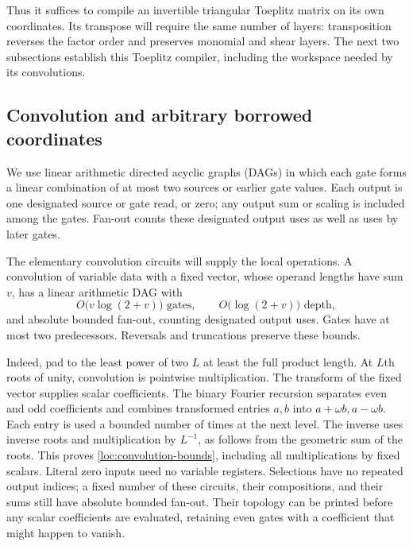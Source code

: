 Thus it suffices to compile an invertible triangular Toeplitz matrix
on its own coordinates.  Its transpose will require the same number
of layers: transposition reverses the factor order and preserves
monomial and shear layers.  The next two subsections establish this
Toeplitz compiler, including the workspace needed by its convolutions.

\subsection{Convolution and arbitrary borrowed coordinates}

We use linear arithmetic directed acyclic graphs (DAGs) in which each
gate forms a linear combination of at most two sources or earlier gate
values.  Each output is one designated source or gate read, or zero;
any output sum or scaling is included among the gates.  Fan-out counts
these designated output uses as well as uses by later gates.

The elementary convolution circuits will supply the local operations.
A convolution of variable data with a fixed vector, whose operand lengths have sum $v$, has a linear
arithmetic DAG with
\begin{equation}\label{loc:convolution-bounds}
 O\bigl(v\log(2+v)\bigr)\text{ gates},\qquad
 O\bigl(\log(2+v)\bigr)\text{ depth},
\end{equation}
and absolute bounded fan-out, counting designated output uses.  Gates
have at most two predecessors.  Reversals and truncations preserve
these bounds.

Indeed, pad to the least power of two $L$ at least the full product
length.  At $L$th roots of unity, convolution is pointwise
multiplication.  The transform of the fixed vector supplies scalar
coefficients.  The binary Fourier recursion separates even and odd
coefficients and combines transformed entries $a,b$ into
$a+\omega b,a-\omega b$.  Each entry is used a bounded number of times
at the next level.  The inverse uses inverse roots and multiplication
by $L^{-1}$, as follows from the geometric sum of the roots.  This
proves \eqref{loc:convolution-bounds}, including all multiplications by
fixed scalars.  Literal zero inputs need no variable registers.
Selections have no repeated output indices; a fixed number of these
circuits, their compositions, and their sums still have absolute
bounded fan-out.  Their topology can be printed before any scalar
coefficients are evaluated, retaining even gates with a coefficient
that might happen to vanish.

